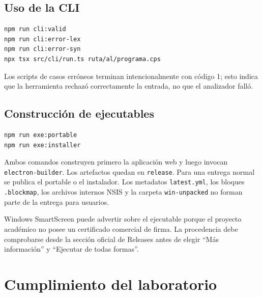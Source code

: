 \documentclass[12pt,letterpaper,oneside]{report}
\newcommand{\archivo}[1]{\texttt{#1}}
\begin{document}
\section{Uso de la CLI}

\begin{verbatim}
npm run cli:valid
npm run cli:error-lex
npm run cli:error-syn
npx tsx src/cli/run.ts ruta/al/programa.cps
\end{verbatim}

Los scripts de casos erróneos terminan intencionalmente con código 1; esto indica que
la herramienta rechazó correctamente la entrada, no que el analizador falló.

\section{Construcción de ejecutables}

\begin{verbatim}
npm run exe:portable
npm run exe:installer
\end{verbatim}

Ambos comandos construyen primero la aplicación web y luego invocan
\archivo{electron-builder}. Los artefactos quedan en \archivo{release}. Para una
entrega normal se publica el portable o el instalador. Los metadatos
\archivo{latest.yml}, los bloques \archivo{.blockmap}, los archivos internos NSIS y
la carpeta \archivo{win-unpacked} no forman parte de la entrega para usuarios.

Windows SmartScreen puede advertir sobre el ejecutable porque el proyecto académico
no posee un certificado comercial de firma. La procedencia debe comprobarse desde la
sección oficial de Releases antes de elegir ``Más información'' y ``Ejecutar de todas
formas''.

\chapter{Cumplimiento del laboratorio}
\end{document}
